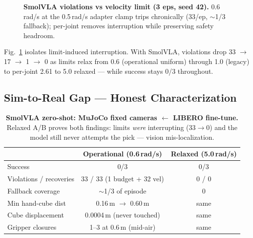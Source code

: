 \documentclass[11pt,a4paper,twocolumn]{article}
\begin{document}
\begin{figure}[htbp]
\centering
{}
\caption{\textbf{SmolVLA violations vs velocity limit (3 eps, seed 42).} 0.6\,rad/s at the 0.5\,rad/s adapter clamp trips chronically (33/ep, $\sim$1/3 fallback); per-joint removes interruption while preserving safety headroom.}
\label{fig:ablation}
\end{figure}

Fig.~\ref{fig:ablation} isolates limit-induced interruption. With SmolVLA, violations drop 33 $\rightarrow$ 17 $\rightarrow$ 1 $\rightarrow$ 0 as limits relax from 0.6 (operational uniform) through 1.0 (legacy) to per-joint 2.61 to 5.0 relaxed --- while success stays 0/3 throughout.

\subsection{Sim-to-Real Gap --- Honest Characterization}

\begin{table}[htbp]
\centering
\footnotesize
\begin{tabular}{lcc}
\toprule
 & \textbf{Operational (0.6\,rad/s)} & \textbf{Relaxed (5.0\,rad/s)} \\
\midrule
Success & 0/3 & 0/3 \\
Violations / recoveries & 33 / 33 (1 budget + 32 vel) & 0 / 0 \\
Fallback coverage & $\sim$1/3 of episode & 0 \\
Min hand-cube dist & 0.16\,m $\rightarrow$ 0.60\,m & same \\
Cube displacement & 0.0004\,m (never touched) & same \\
Gripper closures & 1--3 at 0.6\,m (mid-air) & same \\
\bottomrule
\end{tabular}
\caption{\textbf{SmolVLA zero-shot: MuJoCo fixed cameras $\leftarrow$ LIBERO fine-tune.} Relaxed A/B proves both findings: limits \textit{were} interrupting (33$\rightarrow$0) and the model still never attempts the pick --- vision mis-localization.}
\label{tab:gap}
\end{table}
\end{document}
